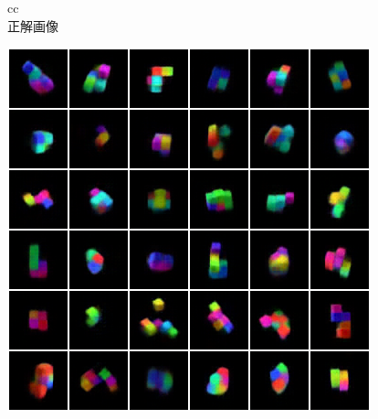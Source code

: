 \begin{figure}[tbp]
  \begin{center}
    \begin{tabular}{cc}
      \\
       {正解画像} \\
      \begin{minipage}{0.5\linewidth}
        \begin{center}
          \includegraphics[width=\linewidth]{./figures/comparison_baseline.png}

\end{center}
\end{minipage}
\end{tabular}
\end{center}
\end{figure}
